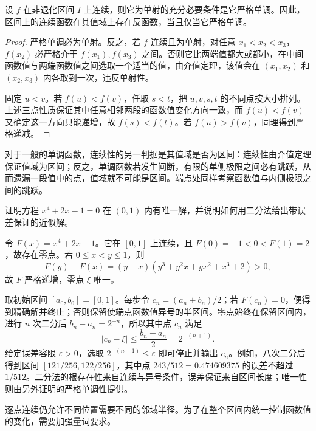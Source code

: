 \documentclass[UTF8,12pt,a4paper,fontset=fandol]{ctexbook}
\begin{document}
\begin{proposition}[连续函数的单射性与严格单调性]
\label{prop:continuous-injective-function-strict-monotonicity}
设 $f$ 在非退化区间 $I$ 上连续，则它为单射的充分必要条件是它严格单调。因此，区间上的连续函数在其值域上存在反函数，当且仅当它严格单调。
\end{proposition}

\begin{proof}
严格单调必为单射。反之，若 $f$ 连续且为单射，对任意 $x_1<x_2<x_3$，$f(x_2)$ 必严格介于 $f(x_1),f(x_3)$ 之间。否则它比两端值都大或都小，在中间函数值与两端函数值之间选取一个适当的值，由介值定理，该值会在 $(x_1,x_2)$ 和 $(x_2,x_3)$ 内各取到一次，违反单射性。

固定 $u<v$。若 $f(u)<f(v)$，任取 $s<t$，把 $u,v,s,t$ 的不同点按大小排列。上述三点性质保证其中任意相邻两段的函数值变化方向一致，而 $f(u)<f(v)$ 又确定这一方向只能递增，故 $f(s)<f(t)$。若 $f(u)>f(v)$，同理得到严格递减。
\end{proof}

对于一般的单调函数，连续性的另一判据是其值域是否为区间：连续性由介值定理保证值域为区间；反之，单调函数若发生间断，有限的单侧极限之间必有跳跃，从而遗漏一段值中的点，值域就不可能是区间。端点处同样考察函数值与内侧极限之间的跳跃。

\begin{example}
\label{ex:continuous-zero-and-bisection}
证明方程 $x^4+2x-1=0$ 在 $(0,1)$ 内有唯一解，并说明如何用二分法给出带误差保证的近似解。
\end{example}

\begin{solve}
令 $F(x)=x^4+2x-1$。它在 $[0,1]$ 上连续，且 $F(0)=-1<0<F(1)=2$，故存在零点。若 $0\leq x<y\leq1$，则
\[
    F(y)-F(x)=(y-x)(y^3+y^2x+yx^2+x^3+2)>0,
\]
故 $F$ 严格递增，零点 $\xi$ 唯一。

取初始区间 $[a_0,b_0]=[0,1]$。每步令 $c_n=(a_n+b_n)/2$；若 $F(c_n)=0$，便得到精确解并终止；否则保留使端点函数值异号的半区间。零点始终在保留区间内，进行 $n$ 次二分后 $b_n-a_n=2^{-n}$，所以其中点 $c_n$ 满足
\[
    |c_n-\xi|\leq\frac{b_n-a_n}{2}=2^{-(n+1)}.
\]
给定误差容限 $\varepsilon>0$，选取 $2^{-(n+1)}\leq\varepsilon$ 即可停止并输出 $c_n$。例如，八次二分后得到区间 $[121/256,122/256]$，其中点 $243/512=0.474609375$ 的误差不超过 $1/512$。二分法的根存在性来自连续与异号条件，误差保证来自区间长度；唯一性则由另外证明的严格单调性提供。
\end{solve}

逐点连续仍允许不同位置需要不同的邻域半径。为了在整个区间内统一控制函数值的变化，需要加强量词要求。
\end{document}
